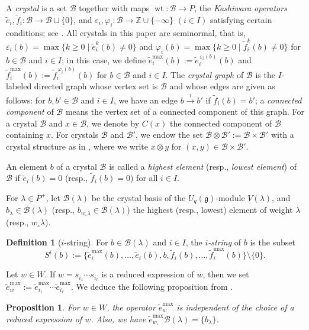 \documentclass[reqno]{amsart}
\newtheorem{proposition}[theorem]{Proposition}
\theoremstyle{definition}
\newtheorem{definition}[theorem]{Definition}
\theoremstyle{remark}
\numberwithin{equation}{section}
\newcommand{\g}{\mathfrak{g}}
\newcommand{\B}{\mathcal{B}}
\newcommand{\wt}{\operatorname{wt}}
\newcommand{\te}{\tilde e}
\newcommand{\tf}{\tilde f}
\newcommand{\Bl}{\B(\lambda)}
\begin{document}
	A \emph{crystal} is a set $\B$ together with maps
	$\wt:\B\to P$, the \emph{Kashiwara operators}
	$\te_i,\tf_i:\B\to\B\sqcup\{0\}$, and
	$\varepsilon_i,\varphi_i:\B\to\mathbb{Z}\cup\{-\infty\}$ $(i\in I)$
	satisfying certain conditions;
	see \cite[Definition 4.5.1]{hongkong}.
	All crystals in this paper are seminormal, that is,
	$\varepsilon_i(b)=\max\{k\ge0\mid\te_i^k(b)\ne0\}$ and
	$\varphi_i(b)=\max\{k\ge0\mid\tf_i^k(b)\ne0\}$ for $b\in\B$ and $i\in I$;
	in this case, we define $
	\tilde{e}_i^{\max}(b) := \tilde{e}_i^{\,\varepsilon_i(b)}(b)$ and $
	\tilde{f}_i^{\max}(b) := \tilde{f}_i^{\,\varphi_i(b)}(b)$
	for $b\in \B$ and $i\in I$.
	The \emph{crystal graph} of $\B$ is the $I$-labeled directed graph whose vertex set is $\B$ and whose edges are given as follows:
	for $b,b'\in\B$ and $i\in I$,
	we have an edge $b\xrightarrow{\,i\,}b'$ if $\tf_i(b)=b'$;
	a \emph{connected
		component} of $\B$ means the vertex set of a connected component of this graph.
	For a crystal $\B$ and $x\in\B$, we denote by $C(x)$ the connected component of $\B$
	containing $x$.
	For crystals $\B$ and $\B'$,
	we endow the set $\B\otimes\B':=\B\times\B'$ with a crystal structure as in \cite[\S 4.4]{hongkong},
	where we write $x\otimes y$ for $(x,y)\in\B\times\B'$.
	
	An element $b$ of a crystal $\B$ is called a \emph{highest element} (resp., \emph{lowest element}) of $\B$
	if $\te_i(b)=0$ (resp., $\tf_i(b)=0$) for all $i\in I$.

	For $\lambda\in P^+$,
	let $\Bl$ be the crystal basis of the $U_q(\g)$-module $V(\lambda)$,
	and $b_\lambda\in\Bl$ (resp., $b_{w_\circ\lambda}\in\Bl$) the highest (resp., lowest) element of weight $\lambda$ (resp., $w_\circ\lambda$).

	\begin{definition}[$i$-string]\label{def:i-string}
		For $b\in\Bl$ and $i\in I$, the \emph{$i$-string} of $b$ is the subset
		\[
		S^i(b):=\{\te_i^{\max}(b),\dots,\te_i(b),b,\tf_i(b),\dots,\tf_i^{\max}(b)\}\setminus\{0\}.
		\]
	\end{definition}
	
	Let $w\in W$.
	If $w=s_{i_1}\cdots s_{i_\ell}$ is a reduced expression of $w$, 
	then we set $\te_{w}^{\max}:=\te_{i_1}^{\max}\cdots\te_{i_\ell}^{\max}$.
	We deduce the following proposition from \cite[\S 7.2]{kashiwara1994}.
	
	\begin{proposition}\label{prop:eimax-indep}
		For $w\in W$, the operator $\te_{w}^{\max}$ is independent of the choice of a
		reduced expression of $w$.
		Also, we have $\te_{w_\circ}^{\max}\B(\lambda)=\{b_\lambda\}$.
	\end{proposition}
\end{document}
